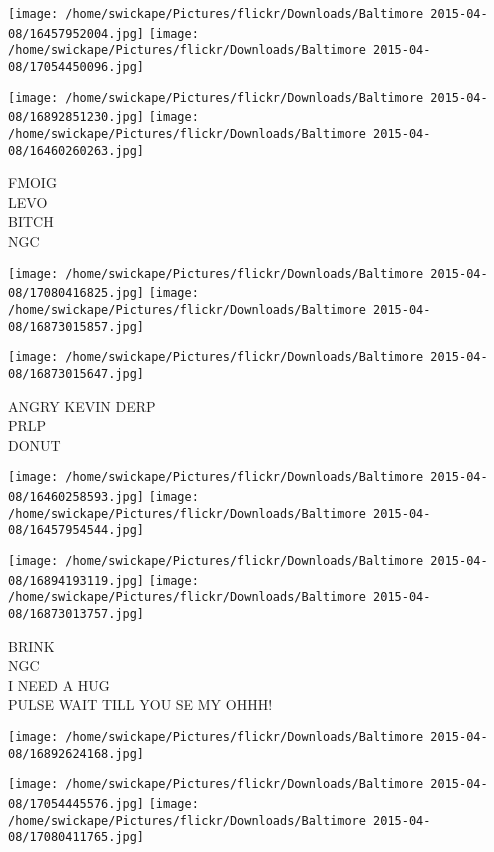 \documentclass[10pt,letterpaper]{article}
\begin{document}
\texttt{[image: /home/swickape/Pictures/flickr/Downloads/Baltimore 2015-04-08/16457952004.jpg]}
\texttt{[image: /home/swickape/Pictures/flickr/Downloads/Baltimore 2015-04-08/17054450096.jpg]}

\texttt{[image: /home/swickape/Pictures/flickr/Downloads/Baltimore 2015-04-08/16892851230.jpg]}
\texttt{[image: /home/swickape/Pictures/flickr/Downloads/Baltimore 2015-04-08/16460260263.jpg]}

FMOIG\\
LEVO\\
BITCH\\
NGC\\
\pagebreak

\texttt{[image: /home/swickape/Pictures/flickr/Downloads/Baltimore 2015-04-08/17080416825.jpg]}
\texttt{[image: /home/swickape/Pictures/flickr/Downloads/Baltimore 2015-04-08/16873015857.jpg]}

\vspace{0.25in}
\texttt{[image: /home/swickape/Pictures/flickr/Downloads/Baltimore 2015-04-08/16873015647.jpg]}

ANGRY KEVIN DERP\\
PRLP\\
DONUT\\
\pagebreak

\texttt{[image: /home/swickape/Pictures/flickr/Downloads/Baltimore 2015-04-08/16460258593.jpg]}
\texttt{[image: /home/swickape/Pictures/flickr/Downloads/Baltimore 2015-04-08/16457954544.jpg]}

\texttt{[image: /home/swickape/Pictures/flickr/Downloads/Baltimore 2015-04-08/16894193119.jpg]}
\texttt{[image: /home/swickape/Pictures/flickr/Downloads/Baltimore 2015-04-08/16873013757.jpg]}

BRINK\\
NGC\\
I NEED A HUG\\
PULSE WAIT TILL YOU SE MY OHHH!\\
\pagebreak

\texttt{[image: /home/swickape/Pictures/flickr/Downloads/Baltimore 2015-04-08/16892624168.jpg]}

\vspace{0.25in}
\texttt{[image: /home/swickape/Pictures/flickr/Downloads/Baltimore 2015-04-08/17054445576.jpg]}
\texttt{[image: /home/swickape/Pictures/flickr/Downloads/Baltimore 2015-04-08/17080411765.jpg]}
\end{document}
